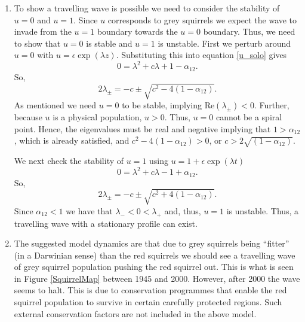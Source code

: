 \documentclass[10pt]{article}
\newcommand{\bb}{\begin{equation}}
\newcommand{\ee}{\end{equation}}
\newcommand{\fig}[1]{Figure \ref{#1}}
\newcommand{\eqn}[1]{equation \eqref{#1}}
\begin{document}
\begin{Answ}
\begin{enumerate}
\item To show a travelling wave is possible we need to consider the stability of $u=0$ and $u=1$. Since $u$ corresponds to grey squirrels we expect the wave to invade from the $u=1$ boundary towards the $u=0$ boundary. Thus, we need to show that $u=0$ is stable and $u=1$ is unstable. First we perturb around $u=0$ with $u=\epsilon\exp(\lambda z)$. Substituting this into \eqn{u_solo} gives
\bb
0=\lambda^2+c\lambda+1-\alpha_{12}.
\ee
So,
\bb
2\lambda_\pm=-c\pm\sqrt{c^2-4(1-\alpha_{12})}.
\ee
As mentioned we need $u=0$ to be stable, implying Re$(\lambda_\pm)<0$. Further, because $u$ is a physical population, $u>0$. Thus, $u=0$ cannot be a spiral point. Hence, the eigenvalues must be real and negative implying that $1>\alpha_{12}$, which is already satisfied, and $c^2-4(1-\alpha_{12})>0$, or $c> 2\sqrt{(1-\alpha_{12})}$.

We next check the stability of $u=1$ using $u=1+\epsilon\exp(\lambda t)$
\bb
0=\lambda^2+c\lambda-1+\alpha_{12}.
\ee
So,
\bb
2\lambda_\pm=-c\pm\sqrt{c^2+4(1-\alpha_{12})}.
\ee
Since $\alpha_{12}<1$ we have that $\lambda_-<0<\lambda_+$ and, thus, $u=1$ is unstable. Thus, a travelling wave with a stationary profile can exist.



\item The suggested model dynamics are that due to grey squirrels being ``fitter'' (in a Darwinian sense) than the red squirrels we should see a travelling wave of grey squirrel population pushing the red squirrel out. This is what is seen in \fig{SquirrelMap} between 1945 and 2000. However, after 2000 the wave seems to halt. This is due to conservation programmes that enable the red squirrel population to survive in certain carefully protected regions. Such external conservation factors are not included in the above model.
\end{enumerate}
\end{Answ}
\end{document}
